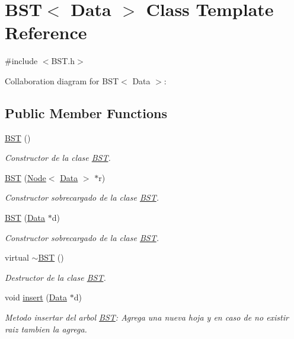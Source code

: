\hypertarget{class_b_s_t}{\section{B\+S\+T$<$ Data $>$ Class Template Reference}
\label{class_b_s_t}
}


{\ttfamily \#include $<$B\+S\+T.\+h$>$}



Collaboration diagram for B\+S\+T$<$ Data $>$\+:
\subsection*{Public Member Functions}
\begin{DoxyCompactItemize}
\item 
\hyperlink{class_b_s_t_ae8c626ed756142bd58283573e15eaef3}{B\+S\+T} ()
\begin{DoxyCompactList}\small\item\em Constructor de la clase \hyperlink{class_b_s_t}{B\+S\+T}. \end{DoxyCompactList}\item 
\hyperlink{class_b_s_t_a1b3e547b32a6ac7fcf76c77d556d456e}{B\+S\+T} (\hyperlink{class_node}{Node}$<$ \hyperlink{class_data}{Data} $>$ $\ast$r)
\begin{DoxyCompactList}\small\item\em Constructor sobrecargado de la clase \hyperlink{class_b_s_t}{B\+S\+T}. \end{DoxyCompactList}\item 
\hyperlink{class_b_s_t_a3006134db9a7013c903e108e582764c2}{B\+S\+T} (\hyperlink{class_data}{Data} $\ast$d)
\begin{DoxyCompactList}\small\item\em Constructor sobrecargado de la clase \hyperlink{class_b_s_t}{B\+S\+T}. \end{DoxyCompactList}\item 
virtual \hyperlink{class_b_s_t_acdaa591d85def33414245d0b7c0c296c}{$\sim$\+B\+S\+T} ()
\begin{DoxyCompactList}\small\item\em Destructor de la clase \hyperlink{class_b_s_t}{B\+S\+T}. \end{DoxyCompactList}\item 
void \hyperlink{class_b_s_t_a3ed5ed757aaf0f131ed9e212b77a1cef}{insert} (\hyperlink{class_data}{Data} $\ast$d)
\begin{DoxyCompactList}\small\item\em Metodo insertar del arbol \hyperlink{class_b_s_t}{B\+S\+T}\+: Agrega una nueva hoja y en caso de no existir raiz tambien la agrega. \end{DoxyCompactList}\item 

\end{DoxyCompactItemize}
